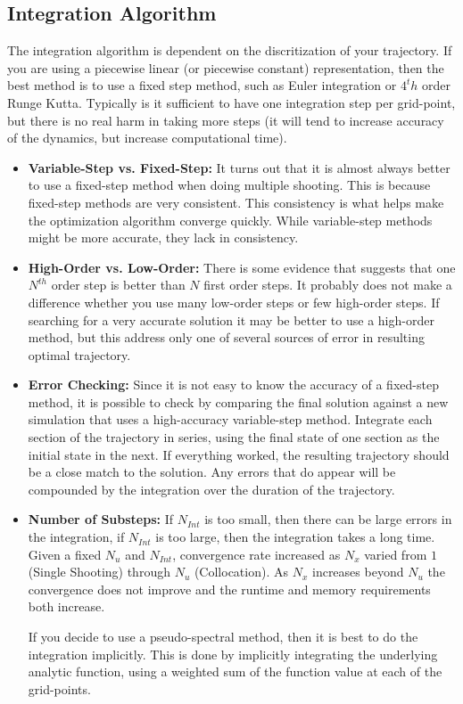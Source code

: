 \subsection{Integration Algorithm}

The integration algorithm is dependent on the discritization of your trajectory. If you are using a piecewise linear (or piecewise constant) representation, then the best method is to use a fixed step method, such as Euler integration or $4^th$ order Runge Kutta. Typically is it sufficient to have one integration step per grid-point, but there is no real harm in taking more steps (it will tend to increase accuracy of the dynamics, but increase computational time). 

\begin{itemize}
	\item{\bf Variable-Step vs. Fixed-Step: } It turns out that it is almost always better to use a fixed-step method when doing multiple shooting. This is because fixed-step methods are very consistent. This consistency is what helps make the optimization algorithm converge quickly. While variable-step methods might be more accurate, they lack in consistency. 

	\item{\bf High-Order vs. Low-Order: } There is some evidence that suggests that one $N^{th}$ order step is better than $N$ first order steps. It probably does not make a difference whether you use many low-order steps or few high-order steps. If searching for a very accurate solution it may be better to use a high-order method, but this address only one of several sources of error in resulting optimal trajectory.

	\item{\bf Error Checking: } Since it is not easy to know the accuracy of a fixed-step method, it is possible to check by comparing the final solution against a new simulation that uses a high-accuracy variable-step method. Integrate each section of the trajectory in series, using the final state of one section as the initial state in the next. If everything worked, the resulting trajectory should be a close match to the solution. Any errors that do appear will be compounded by the integration over the duration of the trajectory.

	\item{\bf Number of Substeps: } If $N_{Int}$ is too small, then there can be large errors in the integration, if $N_{Int}$ is too large, then the integration takes a long time. Given a fixed $N_u$ and $N_{Int}$, convergence rate increased as $N_x$ varied from $1$ (Single Shooting)  through $N_u$ (Collocation). As $N_x$ increases beyond $N_u$ the convergence does not improve and the runtime and memory requirements both increase. 

\par If you decide to use a pseudo-spectral method, then it is best to do the integration implicitly. This is done by implicitly integrating the underlying analytic function, using a weighted sum of the function value at each of the grid-points.

\end{itemize}
